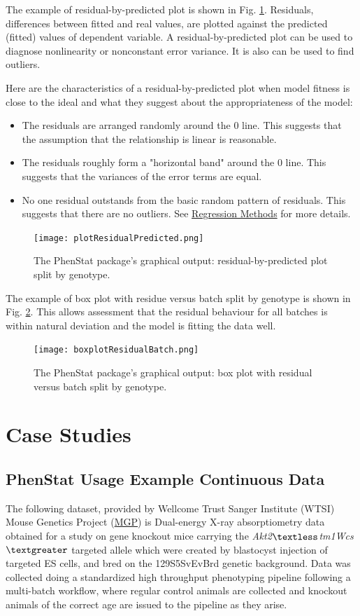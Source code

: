 \documentclass[12pt,a4paper]{article}
\begin{document}
The example of residual-by-predicted plot is shown in Fig. \ref{fig:13}. Residuals, differences between fitted and real values, are plotted against the predicted (fitted) values of dependent variable.  
A residual-by-predicted plot can be used to diagnose nonlinearity or nonconstant error variance. It is also can be used to find outliers. 

Here are the characteristics of a residual-by-predicted plot when model fitness is close to the ideal and what they suggest about the appropriateness of the model:
\begin{itemize}
\item The residuals are arranged randomly around the 0 line. This suggests that the assumption that the relationship is linear is reasonable.
\item The residuals roughly form a "horizontal band" around the 0 line. This suggests that the variances of the error terms are equal.
\item No one residual outstands from the basic random pattern of residuals. This suggests that there are no outliers. See \href{https://onlinecourses.science.psu.edu/stat501/node/36}{Regression Methods} for more details.
\end{itemize}
\begin{figure}[!htpb]%
\centerline{\texttt{[image: plotResidualPredicted.png]}}
\caption{The PhenStat package's graphical output: residual-by-predicted plot split by genotype.}\label{fig:13}
\end{figure}

The example of box plot with residue versus batch split by genotype is shown in Fig. \ref{fig:14}. This allows assessment that the residual behaviour for all batches is within natural deviation and the model is fitting the data well.
\begin{figure}[!htpb]%
\centerline{\texttt{[image: boxplotResidualBatch.png]}}
\caption{The PhenStat package's graphical output: box plot with residual versus batch split by genotype.}\label{fig:14}
\end{figure}
   
\section{Case Studies}
\subsection{PhenStat Usage Example Continuous Data}
The following dataset, provided by Wellcome Trust Sanger Institute (WTSI) Mouse Genetics Project (\href{http://www.sanger.ac.uk/resources/mouse/}{MGP}) 
is Dual-energy X-ray absorptiometry data obtained for a study on gene knockout mice carrying the \textit{Akt2$\textless$tm1Wcs$\textgreater$} targeted allele which were created by blastocyst 
injection of targeted ES cells, and bred on the 129S5\/SvEvBrd genetic background.  
Data was collected doing a standardized high throughput phenotyping pipeline following a multi-batch workflow, where regular control animals are collected and knockout animals of the correct age are issued to the pipeline as they arise.  
\end{document}
